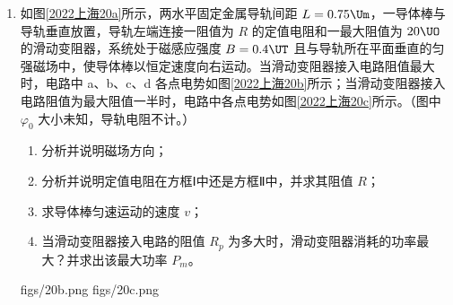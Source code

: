 \documentclass[\gkver]{gaokaozhenti}
\begin{document}
\begin{enumerate}
{解得：$F_{\text{max}}=\frac{E_{1}+\mu mgL-mgh_{1}}{L}$

要能过 C 点，即 C 点的临界速度为 0，设此过程 B 点的速度为 $v_{B}'$，根据机械能守恒定律

$v_{B}'=\sqrt{2gh_{2}}$

设最小推力为 $F_{\text{min}}$，由运动学公式和牛顿第二定律可解得：

$F_{\text{min}}=\left(\mu+\frac{h_{2}}{L}\right)mg$

此题也可以用全过程动能定理更简便地得出答案。

整个过程：$F_{\text{max}}L-\mu mgL+mgh_{1}=E_{1}$

所以，$F_{\text{max}}=\frac{E_{1}+\mu mgL-mgh_{1}}{L}$

要能过 C 点，对整个过程：$F_{\text{min}}L-\mu mgL+mgh_{2}=0$

所以，$F_{\text{min}}=\left(\mu+\frac{h_{2}}{L}\right)mg$

综上所述，$\left(\mu+\frac{h_{2}}{L}\right)mg<F<\frac{E_{1}+\mu mgL-mgh_{1}}{L}$
}

\item
如图\ref{2022上海20a}所示，两水平固定金属导轨间距 $L=0.75 \Um$，一导体棒与导轨垂直放置，导轨左端连接一阻值为 $R$ 的定值电阻和一最大阻值为 $20 \UO$ 的滑动变阻器，系统处于磁感应强度 $B=0.4 \UT$ 且与导轨所在平面垂直的匀强磁场中，使导体棒以恒定速度向右运动。当滑动变阻器接入电路阻值最大时，电路中 a、b、c、d 各点电势如图\ref{2022上海20b}所示；当滑动变阻器接入电路阻值为最大阻值一半时，电路中各点电势如图\ref{2022上海20c}所示。（图中 $\varphi_{0}$ 大小未知，导轨电阻不计。）
\begin{enumerate}
	\item
	分析并说明磁场方向；
	\item
	分析并说明定值电阻在方框Ⅰ中还是方框Ⅱ中，并求其阻值 $R$；
	\item
	求导体棒匀速运动的速度 $v$；
	\item
	当滑动变阻器接入电路的阻值 $R_{p}$ 为多大时，滑动变阻器消耗的功率最大？并求出该最大功率 $P_{m}$。
\end{enumerate}
\threepicture[labelA=2022上海20a, labelB=2022上海20b, labelC=2022上海20c, wA=5cm, wB=6cm, wC=7cm, align=right]
{}
{figs/20b.png}
{figs/20c.png}
\end{enumerate}
\end{document}
